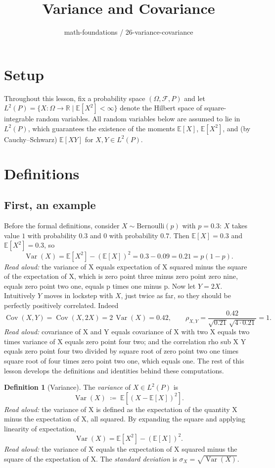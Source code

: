 \documentclass[11pt]{article}
\title{Variance and Covariance}
\author{math-foundations / 26-variance-covariance}
\date{}
\theoremstyle{definition}
\newtheorem{definition}{Definition}
\theoremstyle{remark}
\DeclareMathOperator{\Var}{Var}
\DeclareMathOperator{\Cov}{Cov}
\newcommand{\E}{\mathbb{E}}
\newcommand{\R}{\mathbb{R}}
\begin{document}
\maketitle

\section{Setup}

Throughout this lesson, fix a probability space $(\Omega, \mathcal{F}, P)$ and let
$L^2(P) = \{X : \Omega \to \R \mid \E[X^2] < \infty\}$ denote the Hilbert space of
square-integrable random variables. All random variables below are assumed to
lie in $L^2(P)$, which guarantees the existence of the moments $\E[X]$, $\E[X^2]$,
and (by Cauchy--Schwarz) $\E[XY]$ for $X, Y \in L^2(P)$.

\section{Definitions}

\subsection*{First, an example}
Before the formal definitions, consider $X \sim \mathrm{Bernoulli}(p)$ with $p = 0.3$:
$X$ takes value $1$ with probability $0.3$ and $0$ with probability $0.7$. Then
$\E[X] = 0.3$ and $\E[X^2] = 0.3$, so
\[
\Var(X) = \E[X^2] - (\E[X])^2 = 0.3 - 0.09 = 0.21 = p(1 - p).
\]
\emph{Read aloud:} the variance of X equals expectation of X squared minus the square of the expectation of X, which is zero point three minus zero point zero nine, equals zero point two one, equals p times one minus p.
Now let $Y = 2X$. Intuitively $Y$ moves in lockstep with $X$, just twice as far, so they
should be perfectly positively correlated. Indeed
\[
\Cov(X, Y) = \Cov(X, 2X) = 2\,\Var(X) = 0.42, \qquad \rho_{X,Y} = \frac{0.42}{\sqrt{0.21}\,\sqrt{4 \cdot 0.21}} = 1.
\]
\emph{Read aloud:} covariance of X and Y equals covariance of X with two X equals two times variance of X equals zero point four two; and the correlation rho sub X Y equals zero point four two divided by square root of zero point two one times square root of four times zero point two one, which equals one.
The rest of this lesson develops the definitions and identities behind these computations.

\begin{definition}[Variance]
The \emph{variance} of $X \in L^2(P)$ is
\[
\Var(X) \;\coloneqq\; \E\!\left[(X - \E[X])^2\right].
\]
\emph{Read aloud:} the variance of X is defined as the expectation of the quantity X minus the expectation of X, all squared.
By expanding the square and applying linearity of expectation,
\[
\Var(X) = \E[X^2] - (\E[X])^2.
\]
\emph{Read aloud:} the variance of X equals the expectation of X squared minus the square of the expectation of X.
The \emph{standard deviation} is $\sigma_X = \sqrt{\Var(X)}$.
\end{definition}
\end{document}
